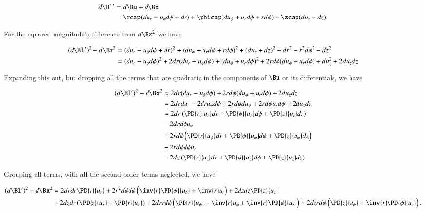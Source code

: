 \begin{align*}
d\Bl' 
&= d\Bu + d\Bx 
\\
&= \rcap( du_r - u_\phi d\phi + dr )
+ \phicap ( du_\phi + u_r d\phi + r d\phi )
+ \zcap ( du_z + dz ).
\end{align*}

For the squared magnitude's difference from $d\Bx^2$ we have

\begin{align*}
(d\Bl')^2 - d\Bx^2
&= 
( du_r - u_\phi d\phi + dr )^2
+ ( du_\phi + u_r d\phi + r d\phi )^2
+ ( du_z + dz )^2
-dr^2 - r^2 d\phi^2 - dz^2 \\
&=
( du_r - u_\phi d\phi )^2 
+ 2 dr ( du_r - u_\phi d\phi )
+ ( du_\phi + u_r d\phi )^2
+ 2 r d\phi ( du_\phi + u_r d\phi )
+ du_z^2 + 2 du_z dz \\
\end{align*}

Expanding this out, but dropping all the terms that are quadratic in the components of $\Bu$ or its differentials, we have

\begin{align*}
(d\Bl')^2 - d\Bx^2
&\approx
  2 dr ( du_r - u_\phi d\phi )
+ 2 r d\phi ( du_\phi + u_r d\phi )
+ 2 du_z dz \\
&=
  2 dr du_r 
- 2 dr u_\phi d\phi 
+ 2 r d\phi du_\phi 
+ 2 r d\phi u_r d\phi 
+ 2 du_z dz 
\\
&=
  2 dr 
\left( 
\PD{r}{u_r} dr
+\PD{\phi}{u_r} d\phi
+\PD{z}{u_r} dz
\right) \\
&- 2 dr d\phi u_\phi  \\
&+ 2 r d\phi 
\left( 
\PD{r}{u_\phi} dr
+\PD{\phi}{u_\phi} d\phi
+\PD{z}{u_\phi} dz
\right) \\
&+ 2 r d\phi d\phi u_r \\
&+ 2 
dz 
\left( 
\PD{r}{u_z} dr
+\PD{\phi}{u_z} d\phi
+\PD{z}{u_z} dz
\right) \\
\end{align*}

Grouping all terms, with all the second order terms neglected, we have

\begin{equation}\label{eqn:continuumL2:n}
\begin{aligned}
(d\Bl')^2 - d\Bx^2
&=
2 dr dr \PD{r}{u_r} 
+ 2 r^2 d\phi d\phi \left( \inv{r} \PD{\phi}{u_\phi} +\inv{r} u_r \right)
+ 2 dz dz \PD{z}{u_z}  \\
&+ 2 dz dr \left( \PD{z}{u_r} + \PD{r}{u_z} \right)
+ 2 dr r d\phi \left( \PD{r}{u_\phi} - \inv{r} u_\phi + \inv{r} \PD{\phi}{u_r} \right)
+ 2 dz r d\phi \left( \PD{z}{u_\phi} +\inv{r} \PD{\phi}{u_z} \right).
\end{aligned}
\end{equation}

